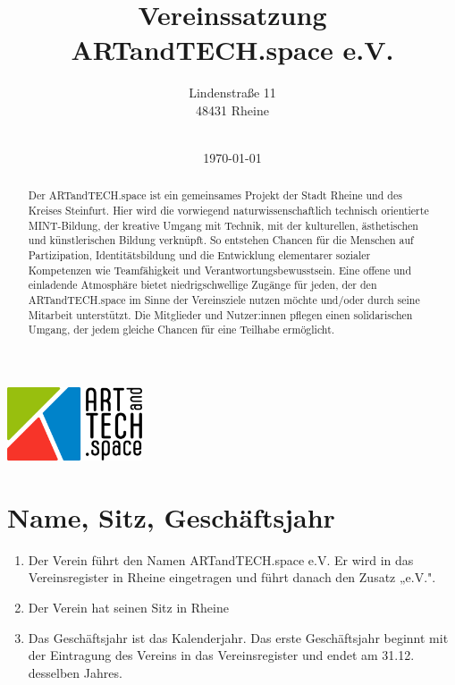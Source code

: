 \documentclass[12pt]{article}
\title{Vereinssatzung \\
ARTandTECH.space e.V.}
\author{
	Lindenstraße 11 \\
	48431 Rheine \\
    \
	}
\date{\today}
\begin{document}
\maketitle

\begin{center}
	\includegraphics[width=0.3\textwidth]{assets/logo.png}
\end{center}

\thispagestyle{fancy}

\begin{abstract}
	Der ARTandTECH.space ist ein gemeinsames Projekt der Stadt Rheine und des Kreises Steinfurt.
	Hier wird die vorwiegend naturwissenschaftlich technisch orientierte MINT-Bildung, der kreative
	Umgang mit Technik, mit der kulturellen, ästhetischen und künstlerischen Bildung verknüpft. So
	entstehen Chancen für die Menschen auf Partizipation, Identitätsbildung und die Entwicklung
	elementarer sozialer Kompetenzen wie Teamfähigkeit und Verantwortungsbewusstsein.
	Eine offene und einladende Atmosphäre bietet niedrigschwellige Zugänge für jeden, der den
	ARTandTECH.space im Sinne der Vereinsziele nutzen möchte und/oder durch seine Mitarbeit
	unterstützt. Die Mitglieder und Nutzer:innen pflegen einen solidarischen Umgang, der jedem gleiche
	Chancen für eine Teilhabe ermöglicht.
\end{abstract}

\newpage
\tableofcontents
\pagestyle{fancy}
\fancyhf{}

\fancyfoot[R]{Seite \thepage\ von \pageref{LastPage}}
\newpage
\setcounter{page}{1}

\section{Name, Sitz, Geschäftsjahr}
\begin{enumerate}[label=(\arabic*)]
	\item Der Verein führt den Namen ARTandTECH.space e.V. Er wird in das Vereinsregister in Rheine eingetragen und führt danach den Zusatz „e.V.".
	\item Der Verein hat seinen Sitz in Rheine
	\item Das Geschäftsjahr ist das Kalenderjahr. Das erste Geschäftsjahr beginnt mit der Eintragung des Vereins in das Vereinsregister und endet am 31.12. desselben Jahres.
\end{enumerate}
\end{document}

